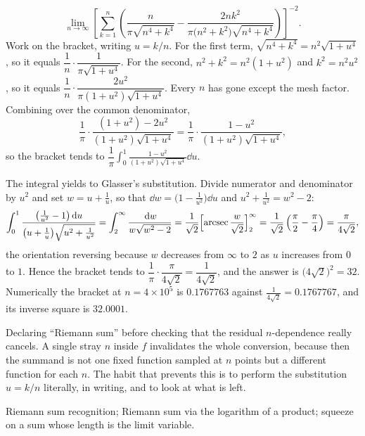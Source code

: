 \begin{worked}
\[\lim_{n\to\infty}\left[\sum_{k=1}^{n}\left(\frac{n}{\pi\sqrt{n^{4}+k^{4}}}-\frac{2nk^{2}}{\pi\bigl(n^{2}+k^{2}\bigr)\sqrt{n^{4}+k^{4}}}\right)\right]^{-2}.\]
Work on the bracket, writing $u=k/n$. For the first term, $\sqrt{n^{4}+k^{4}}=n^{2}\sqrt{1+u^{4}}$, so it equals $\dfrac1n\cdot\dfrac{1}{\pi\sqrt{1+u^{4}}}$. For the second, $n^{2}+k^{2}=n^{2}(1+u^{2})$ and $k^{2}=n^{2}u^{2}$, so it equals $\dfrac1n\cdot\dfrac{2u^{2}}{\pi(1+u^{2})\sqrt{1+u^{4}}}$. Every $n$ has gone except the mesh factor. Combining over the common denominator,
\[\frac{1}{\pi}\cdot\frac{(1+u^{2})-2u^{2}}{(1+u^{2})\sqrt{1+u^{4}}}=\frac{1}{\pi}\cdot\frac{1-u^{2}}{(1+u^{2})\sqrt{1+u^{4}}},\]
so the bracket tends to $\dfrac1\pi\displaystyle\int_{0}^{1}\frac{1-u^{2}}{(1+u^{2})\sqrt{1+u^{4}}}\dd u$.

The integral yields to Glasser's substitution. Divide numerator and denominator by $u^{2}$ and set $w=u+\tfrac1u$, so that $\dd w=\bigl(1-\tfrac{1}{u^{2}}\bigr)\dd u$ and $u^{2}+\tfrac{1}{u^{2}}=w^{2}-2$:
\[\int_{0}^{1}\frac{\bigl(\tfrac{1}{u^{2}}-1\bigr)\,\mathrm{d} u}{\bigl(u+\tfrac1u\bigr)\sqrt{u^{2}+\tfrac{1}{u^{2}}}}=\int_{2}^{\infty}\frac{\,\mathrm{d} w}{w\sqrt{w^{2}-2}}=\frac{1}{\sqrt2}\Bigl[\operatorname{arcsec}\frac{w}{\sqrt2}\Bigr]_{2}^{\infty}=\frac{1}{\sqrt2}\left(\frac\pi2-\frac\pi4\right)=\frac{\pi}{4\sqrt2},\]
the orientation reversing because $w$ decreases from $\infty$ to $2$ as $u$ increases from $0$ to $1$. Hence the bracket tends to $\dfrac1\pi\cdot\dfrac{\pi}{4\sqrt2}=\dfrac{1}{4\sqrt2}$, and the answer is $\bigl(4\sqrt2\bigr)^{2}=32$. Numerically the bracket at $n=4\times10^{5}$ is $0.1767763$ against $\tfrac{1}{4\sqrt2}=0.1767767$, and its inverse square is $32.0001$.
\end{worked}

\begin{trap}
Declaring ``Riemann sum'' before checking that the residual $n$-dependence really cancels. A single stray $n$ inside $f$ invalidates the whole conversion, because then the summand is not one fixed function sampled at $n$ points but a different function for each $n$. The habit that prevents this is to perform the substitution $u=k/n$ literally, in writing, and to look at what is left.
\end{trap}

\begin{seealsob}Riemann sum recognition; Riemann sum via the logarithm of a product; squeeze on a sum whose length is the limit variable.\end{seealsob}

